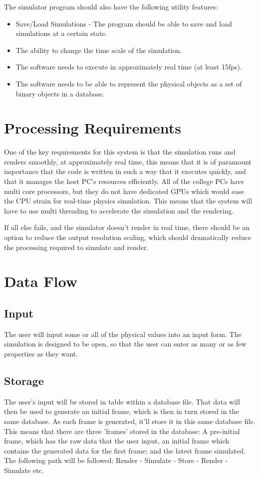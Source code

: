 The simulator program should also have the following utility features:
\begin{itemize}
	\item Save/Load Simulations - The program should be able to save and load simulations at a certain state.
	\item The ability to change the time scale of the simulation.
	\item The software needs to execute in approximately real time (at least 15fps).
	\item The software needs to be able to represent the physical objects as a set of binary objects in a database.

\end{itemize}

\section{Processing Requirements}
One of the key requirements for this system is that the simulation runs and renders smoothly, at approximately real time, this means that it is of paramount importance that the code is written in such a way that it executes quickly, and that it manages the host PC's resources efficiently. All of the college PCs have multi core processors, but they do not have dedicated GPUs which would ease the CPU strain for real-time physics simulation. This means that the system will have to use multi threading to accelerate the simulation and the rendering.

If all else fails, and the simulator doesn't render in real time, there should be an option to reduce the output resolution scaling, which should dramatically reduce the processing required to simulate and render.

\section{Data Flow}
\subsection{Input}
	The user will input some or all of the physical values into an input form. The simulation is designed to be open, so that the user can enter as many or as few properties as they want.

\subsection{Storage}
	The user's input will be stored in table within a database file. That data will then be used to generate an initial frame, which is then in turn stored in the same database. As each frame is generated, it'll store it in this same database file. This means that there are three 'frames' stored in the database: A pre-initial frame, which has the raw data that the user input, an initial frame which contains the generated data for the first frame; and the latest frame simulated. The following path will be followed: Render - Simulate - Store - Render - Simulate etc.

